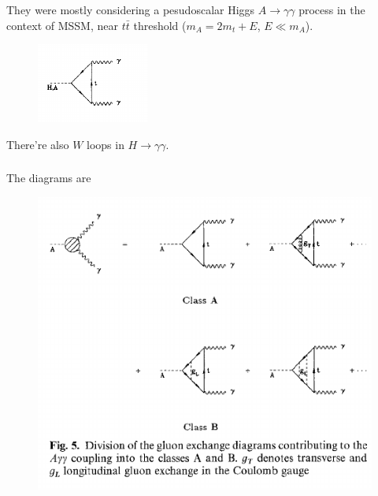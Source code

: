\documentclass[8pt,dvipsnames,table]{beamer}
\begin{document}
\section{\citet{Melnikov:1994jb}}
\begin{frame}
	\frametitle{\citet{Melnikov:1994jb}}

	They were mostly considering a pesudoscalar Higgs $A\to \gamma\gamma$ process in the context of MSSM, near $t\bar t$ threshold ($m_A=2m_t+E$, $E\ll m_A$).
	\begin{figure}[!htb]
		\centering
		\includegraphics[]{image2.png}
		\label{fig:image2}
	\end{figure}
	There're also $W$ loops in $H\to \gamma\gamma$.

\end{frame}

\begin{frame}
	\frametitle{\citet{Melnikov:1994jb}}

	The diagrams are
	\begin{figure}[!htb]
		\centering
		\includegraphics[width=0.8\linewidth]{image4.png}
		\label{fig:image4}
	\end{figure}


\end{frame}
\end{document}
